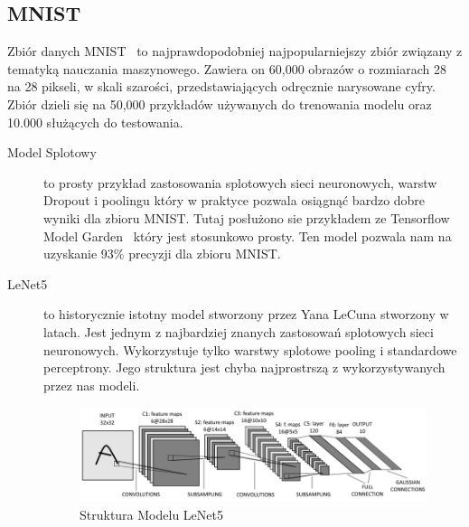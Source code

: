 \documentclass[
    left=2.5cm,         %
    right=2.5cm,        %
    top=2.5cm,          %
    bottom=3cm,         %
    bindingoffset=6mm,  %
    nohyphenation=false %
]{eiti/eiti-thesis}
\begin{document}
    \subsection{MNIST}
    Zbiór danych MNIST~\cite{mnist} to najprawdopodobniej najpopularniejszy zbiór związany z
    tematyką nauczania maszynowego.
    Zawiera on 60,000 obrazów o rozmiarach 28 na 28 pikseli, w skali szarości, przedstawiających
    odręcznie narysowane cyfry. Zbiór dzieli się na 50,000 przykładów używanych do
    trenowania modelu oraz 10.000 służących do testowania.
        \begin{description}
            \item[Model Splotowy] \label{MNIST_TF}
            to prosty przykład zastosowania splotowych sieci neuronowych, warstw Dropout i poolingu
            który w praktyce pozwala osiągnąć bardzo dobre wyniki dla zbioru MNIST. Tutaj posłużono sie przykładem ze
            Tensorflow Model Garden~\cite{tensorflow_model_garden} który jest stosunkowo prosty. Ten model pozwala nam
            na uzyskanie 93\% precyzji dla zbioru MNIST.
            \item[LeNet5]\label{LeNet5}
            to historycznie istotny model stworzony przez Yana LeCuna stworzony w latach.
            Jest jednym z najbardziej znanych zastosowań splotowych sieci neuronowych. Wykorzystuje tylko
            warstwy splotowe pooling i standardowe perceptrony. Jego struktura jest chyba najprostrszą z wykorzystywanych
            przez nas modeli.
           \begin{figure}[H]
               \centring
                \includegraphics[width=\textwidth]{eiti/lenet5_overview.png}
                \caption{Struktura Modelu LeNet5\cite{LeNet5Diagram}}
           \end{figure}
        \end{description}
\end{document}

